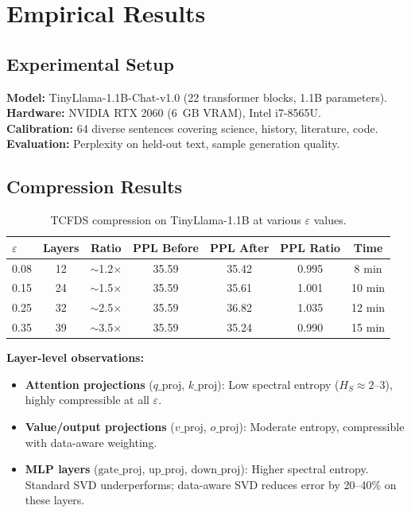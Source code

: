 \documentclass[11pt,a4paper]{article}
\begin{document}
\section{Empirical Results}

\subsection{Experimental Setup}

\textbf{Model:} TinyLlama-1.1B-Chat-v1.0 (22 transformer blocks, 1.1B parameters).\\
\textbf{Hardware:} NVIDIA RTX 2060 (6~GB VRAM), Intel i7-8565U.\\
\textbf{Calibration:} 64 diverse sentences covering science, history, literature, code.\\
\textbf{Evaluation:} Perplexity on held-out text, sample generation quality.

\subsection{Compression Results}

\begin{table}[h]
\centering
\caption{TCFDS compression on TinyLlama-1.1B at various $\varepsilon$ values.}
\begin{tabular}{@{}lcccccc@{}}
\toprule
$\varepsilon$ & Layers & Ratio & PPL Before & PPL After & PPL Ratio & Time \\
\midrule
0.08 & 12 & $\sim$1.2$\times$ & 35.59 & 35.42 & 0.995 & 8 min \\
0.15 & 24 & $\sim$1.5$\times$ & 35.59 & 35.61 & 1.001 & 10 min \\
0.25 & 32 & $\sim$2.5$\times$ & 35.59 & 36.82 & 1.035 & 12 min \\
0.35 & 39 & $\sim$3.5$\times$ & 35.59 & 35.24 & 0.990 & 15 min \\
\bottomrule
\end{tabular}
\label{tab:results}
\end{table}

\textbf{Layer-level observations:}
\begin{itemize}
    \item \textbf{Attention projections} ($q\_\mathrm{proj}$, $k\_\mathrm{proj}$): Low spectral entropy ($H_S \approx 2$--$3$), highly compressible at all $\varepsilon$.
    \item \textbf{Value/output projections} ($v\_\mathrm{proj}$, $o\_\mathrm{proj}$): Moderate entropy, compressible with data-aware weighting.
    \item \textbf{MLP layers} ($\mathrm{gate\_proj}$, $\mathrm{up\_proj}$, $\mathrm{down\_proj}$): Higher spectral entropy. Standard SVD underperforms; data-aware SVD reduces error by 20--40\% on these layers.
\end{itemize}
\end{document}
